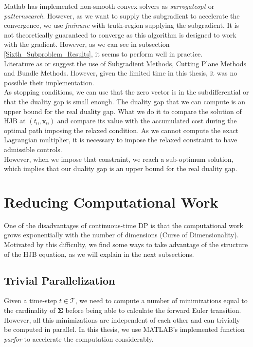 Matlab has implemented non-smooth convex solvers as \textit{surrogateopt} or \textit{patternsearch}. However, as we want to supply the subgradient to accelerate the convergence, we use \textit{fminunc} with truth-region supplying the subgradient. It is not theoretically guaranteed to converge as this algorithm is designed to work with the gradient. However, as we can see in subsection \ref{Sixth_Subproblem_Results}, it seems to perform well in practice.\\
Literature as \cite{bagirov2014introduction} or \cite{bazaraa2013nonlinear} suggest the use of Subgradient Methods, Cutting Plane Methods and Bundle Methods. However, given the limited time in this thesis, it was no possible their implementation.\\
As stopping conditions, we can use that the zero vector is in the subdifferential or that the duality gap is small enough. The duality gap that we can compute is an upper bound for the real duality gap. What we do it to compare the solution of HJB at $(t_0,\bm{x}_0)$ and compare its value with the accumulated cost during the optimal path imposing the relaxed condition. As we cannot compute the exact Lagrangian multiplier, it is necessary to impose the relaxed constraint to have admissible controls.\\
However, when we impose that constraint, we reach a sub-optimum solution, which implies that our duality gap is an upper bound for the real duality gap.
\section{Reducing Computational Work}

One of the disadvantages of continuous-time DP is that the computational work grows exponentially with the number of dimensions (Curse of Dimensionality). Motivated by this difficulty, we find some ways to take advantage of the structure of the HJB equation, as we will explain in the next subsections.

\subsection{Trivial Parallelization}

Given a time-step $t\in\mathcal{T}$, we need to compute a number of minimizations equal to the cardinality of $\bm{\Sigma}$ before being able to calculate the forward Euler transition.\\
However, all this minimizations are independent of each other and can trivially be computed in parallel. In this thesis, we use MATLAB's implemented function \textit{parfor} to accelerate the computation considerably.

